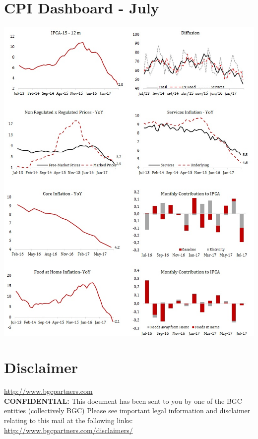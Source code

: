 \documentclass{report}
\begin{document}
\newpage


\section{CPI Dashboard - July}
\label{sec:org553bf0b}

\begin{center}
\includegraphics[width=15.0cm]{images/Second_Page.jpg}
\end{center}


\newpage


\section{Disclaimer}
\label{sec:orgea96597}
\url{http://www.bgcpartners.com} \\
\textbf{CONFIDENTIAL:} This document has been sent to you by one of
the BGC entities (collectively BGC) Please see important legal
information and disclaimer relating to this mail at the following
links: \url{http://www.bgcpartners.com/disclaimers/}
\end{document}
